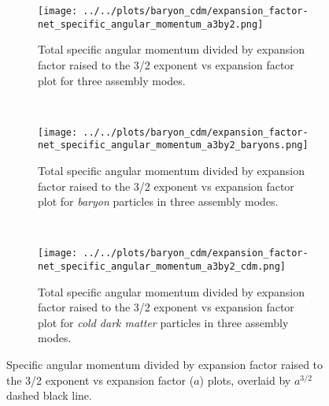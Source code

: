 \documentclass{article}
\begin{document}
	\clearpage 

	\begin{figure}
		\centering
		\begin{subfigure} {\columnwidth}
				\centering 
				\texttt{[image: ../../plots/baryon\_cdm/expansion\_factor-net\_specific\_angular\_momentum\_a3by2.png]}
				\caption{Total specific angular momentum divided by expansion factor raised to the 3/2 exponent vs expansion factor plot for three assembly modes.}
		\end{subfigure} \\
			\vspace{1cm}
		\begin{subfigure} {\columnwidth}
				\centering 
				\texttt{[image: ../../plots/baryon\_cdm/expansion\_factor-net\_specific\_angular\_momentum\_a3by2\_baryons.png]}
				\caption{Total specific angular momentum divided by expansion factor raised to the 3/2 exponent vs expansion factor plot for \emph{baryon} particles in three assembly modes.}
		\end{subfigure} \\
			\vspace{1cm}
		\begin{subfigure} {\columnwidth}
				\centering 
				\texttt{[image: ../../plots/baryon\_cdm/expansion\_factor-net\_specific\_angular\_momentum\_a3by2\_cdm.png]}
				\caption{Total specific angular momentum divided by expansion factor raised to the 3/2 exponent vs expansion factor plot for \emph{cold dark matter} particles in three assembly modes.}
		\end{subfigure}
		\caption{Specific angular momentum divided by expansion factor raised to the 3/2 exponent vs expansion factor (\(a\)) plots, overlaid by \(a^{3/2}\) dashed black line.}
	\end{figure}
\end{document}
